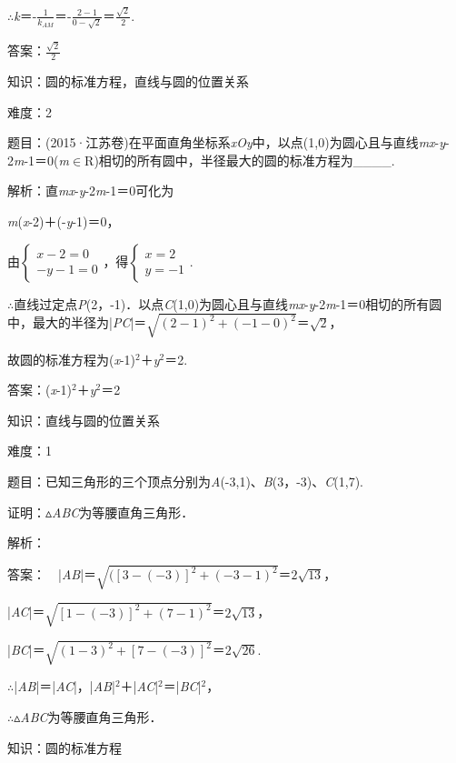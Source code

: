 \documentclass{article} %
\begin{document}
$\mathrm{\therefore}$\textit{k}＝-$\frac{1}{k_{AM}}$＝-$\frac{2-1}{0-\sqrt{2}}$＝$\frac{\sqrt{2}}{2}$.

答案：$\frac{\sqrt{2}}{2}$

知识：圆的标准方程，直线与圆的位置关系

难度：2

题目：(2015·江苏卷)在平面直角坐标系\textit{xOy}中，以点(1,0)为圆心且与直线\textit{mx}-\textit{y}-2\textit{m}-1＝0(\textit{m}$\mathrm{\in}$R)相切的所有圆中，半径最大的圆的标准方程为\_\_\_\_.

解析：直\textit{mx}-\textit{y}-2\textit{m}-1＝0可化为

\textit{m}(\textit{x}-2)＋(-\textit{y}-1)＝0，

由$\left\{\begin{array}{r} x-2=0\\ -y-1=0 \end{array} \right.$，得$\left\{\begin{array}{r} x=2\\ y=-1 \end{array} \right.$.

$\mathrm{\therefore}$直线过定点\textit{P}(2，-1)．以点\textit{C}(1,0)为圆心且与直线\textit{mx}-\textit{y}-2\textit{m}-1＝0相切的所有圆中，最大的半径为|\textit{PC}|＝$\sqrt{(2-1)^2+(-1-0)^2}$＝$\sqrt{2}$，

故圆的标准方程为(\textit{x}-1)${}^{2}$＋\textit{y}${}^{2}$＝2.

答案：(\textit{x}-1)${}^{2}$＋\textit{y}${}^{2}$＝2


知识：直线与圆的位置关系

难度：1

题目：已知三角形的三个顶点分别为\textit{A}(-3,1)、\textit{B}(3，-3)、\textit{C}(1,7).

证明：$\mathrm{\vartriangle}$\textit{ABC}为等腰直角三角形．

解析：

答案：　|\textit{AB}|＝$\sqrt{([3-(-3)]^2+(-3-1)^2}$＝$2\sqrt{13}$，

|\textit{AC}|＝$\sqrt{[1-(-3)]^2+(7-1)^2}$＝$2\sqrt{13}$，

|\textit{BC}|＝$\sqrt{(1-3)^2+[7-(-3)]^2}$＝$2\sqrt{26}$.

$\mathrm{\therefore}$|\textit{AB}|＝|\textit{AC}|，|\textit{AB}|${}^{2}$＋|\textit{AC}|${}^{2}$＝|\textit{BC}|${}^{2}$，

$\mathrm{\therefore}$$\mathrm{\vartriangle}$\textit{ABC}为等腰直角三角形．

知识：圆的标准方程
\end{document}
